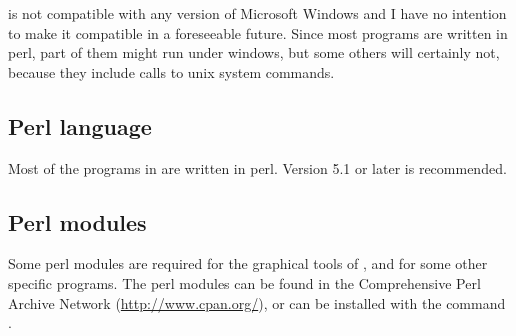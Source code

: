 \documentclass{book}
\begin{document}
\RSAT is not compatible with any version of Microsoft Windows and I
have no intention to make it compatible in a foreseeable future. Since
most programs are written in perl, part of them might run under
windows, but some others will certainly not, because they include
calls to unix system commands.

\subsection{Perl language}

Most of the programs in \RSAT are written in perl. Version 5.1 or
later is recommended.

\subsection{Perl modules}

Some perl modules are required for the graphical tools of \RSAT, and
for some other specific programs. The perl modules can be found in the
Comprehensive Perl Archive Network (\url{http://www.cpan.org/}), or
can be installed with the command .
\end{document}
